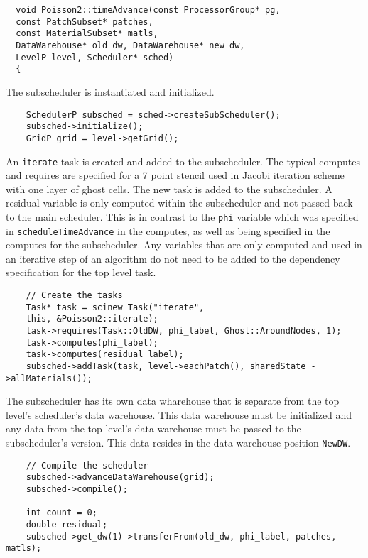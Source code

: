 \documentclass[11pt,fleqn]{book} %
\begin{document}
\begin{lstlisting}
  void Poisson2::timeAdvance(const ProcessorGroup* pg,
  const PatchSubset* patches,
  const MaterialSubset* matls,
  DataWarehouse* old_dw, DataWarehouse* new_dw,
  LevelP level, Scheduler* sched)
  {

  \end{lstlisting}

  The subscheduler is instantiated and initialized. 

  \begin{lstlisting}
    SchedulerP subsched = sched->createSubScheduler();
    subsched->initialize();
    GridP grid = level->getGrid();
  \end{lstlisting}

  An \texttt{iterate} task is created and added to the subscheduler.
  The typical computes and requires are specified for a 7 point stencil
  used in Jacobi iteration scheme with one layer of ghost cells.  The
  new task is added to the subscheduler.  A residual variable is only
  computed within the subscheduler and not passed back to the main
  scheduler.  This is in contrast to the \texttt{phi} variable which was
  specified in \texttt{scheduleTimeAdvance} in the computes, as well as
  being specified in the computes for the subscheduler.  Any variables
  that are only computed and used in an iterative step of an algorithm
  do not need to be added to the dependency specification for the top
  level task.

  \begin{lstlisting}
    // Create the tasks
    Task* task = scinew Task("iterate",
    this, &Poisson2::iterate);
    task->requires(Task::OldDW, phi_label, Ghost::AroundNodes, 1);
    task->computes(phi_label);
    task->computes(residual_label);
    subsched->addTask(task, level->eachPatch(), sharedState_->allMaterials());
  \end{lstlisting}

  The subscheduler has its own data wharehouse that is separate from the
  top level's scheduler's data warehouse.  This data warehouse must be
  initialized and any data from the top level's data warehouse must be
  passed to the subscheduler's version.  This data resides in the data
  warehouse position \texttt{NewDW}.

  \begin{lstlisting}
    // Compile the scheduler
    subsched->advanceDataWarehouse(grid);
    subsched->compile();

    int count = 0;
    double residual;
    subsched->get_dw(1)->transferFrom(old_dw, phi_label, patches, matls);
  \end{lstlisting}
\end{document}
